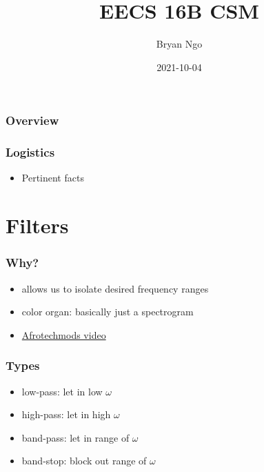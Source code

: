 \documentclass[aspectratio=169]{beamer}
\title{EECS 16B CSM}
\author{Bryan Ngo}
\date{2021-10-04}
\institute{Computer Science Mentors}
\begin{document}
\begin{frame}
    \maketitle
\end{frame}

\begin{frame}
    \frametitle{Overview}

    \tableofcontents
\end{frame}

\begin{frame}
    \frametitle{Logistics}

    \begin{itemize}
        \item Pertinent facts
    \end{itemize}
\end{frame}

\section{Filters}

\begin{frame}
    \frametitle{Why?}

    \begin{itemize}
        \item allows us to isolate desired frequency ranges
        \item color organ: basically just a spectrogram
        \item \href{https://youtu.be/OBM5T5_kgdI}{Afrotechmods video}
    \end{itemize}
\end{frame}

\begin{frame}
    \frametitle{Types}

    \begin{itemize}
        \item low-pass: let in low \(\omega\)
        \item high-pass: let in high \(\omega\)
        \item band-pass: let in range of \(\omega\)
        \item band-stop: block out range of \(\omega\)
    \end{itemize}

\end{frame}
\end{document}

